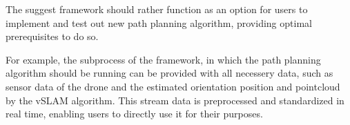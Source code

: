 \begin{enumerate}
 The suggest framework should rather function as an option for users to implement and test out new path planning algorithm, providing optimal 
 prerequisites to do so. 
 
 For example, the subprocess of the framework, in which the path planning algorithm should be running can be provided with all necessery data, 
 such as sensor data of the drone and the estimated orientation position and pointcloud by the vSLAM algorithm. This stream data is preprocessed 
 and standardized 
 in real time, enabling users to directly use it for their purposes. 
 
 
\end{enumerate} 
 
 




